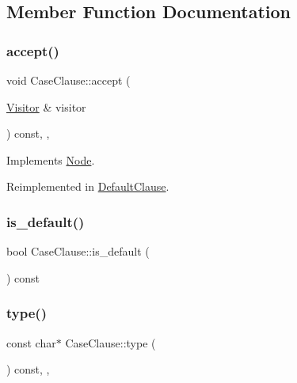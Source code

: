 \subsection{Member Function Documentation}
\mbox{\label{struct_case_clause_a5bbee9ea9ca206c09b8b79f8c96720a1}} 
\subsubsection{\texorpdfstring{accept()}{accept()}}
{\footnotesize\ttfamily void Case\+Clause\+::accept (\begin{DoxyParamCaption}\item[{\hyperlink{struct_visitor}{Visitor} \&}]{visitor }\end{DoxyParamCaption}) const\hspace{0.3cm}{\ttfamily [inline]}, {\ttfamily [override]}, {\ttfamily [virtual]}}



Implements \hyperlink{struct_node_a10bd7af968140bbf5fa461298a969c71}{Node}.



Reimplemented in \hyperlink{struct_default_clause_ade62e79cf9ad891d974528e1e172e2b6}{Default\+Clause}.

\mbox{\label{struct_case_clause_a8ef15339531ef33d3ae335d96317b30a}} 
\subsubsection{\texorpdfstring{is\+\_\+default()}{is\_default()}}
{\footnotesize\ttfamily bool Case\+Clause\+::is\+\_\+default (\begin{DoxyParamCaption}{ }\end{DoxyParamCaption}) const\hspace{0.3cm}{\ttfamily [inline]}}

\mbox{\label{struct_case_clause_a9dcb0a1a072df7d577b272c6bbb3c6dc}} 
\subsubsection{\texorpdfstring{type()}{type()}}
{\footnotesize\ttfamily const char$\ast$ Case\+Clause\+::type (\begin{DoxyParamCaption}{ }\end{DoxyParamCaption}) const\hspace{0.3cm}{\ttfamily [inline]}, {\ttfamily [override]}, {\ttfamily [virtual]}}



